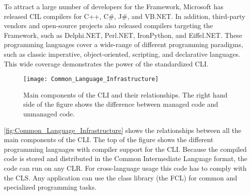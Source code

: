 To attract a large number of developers for the \dotNET Framework, Microsoft has released CIL compilers for C++, C\#, J\#, and VB.NET.
In addition, third-party vendors and open-source projects also released compilers targeting the \dotNET Framework, such as Delphi.NET, Perl.NET, IronPython, and Eiffel.NET.
These programming languages cover a wide-range of different programming paradigms, such as classic imperative, object-oriented, scripting, and declarative languages. This wide coverage demonstrates the power of the standardized CLI.

\begin{figure}
 \centering
 \texttt{[image: Common\_Language\_Infrastructure]}
 \caption[Main components of the CLI and their relationships]{%
    Main components of the CLI and their relationships.
    The right hand side of the figure shows the difference between managed code and unmanaged code.}
 \label{fig:Common_Language_Infrastructure}
\end{figure}

\autoref{fig:Common_Language_Infrastructure} shows the relationships between all the main components of the CLI.
The top of the figure shows the different programming languages with compiler support for the CLI. Because the compiled code is stored and distributed in the Common Intermediate Language format, the code can run on any CLR. For cross-language usage this code has to comply with the CLS.
Any application can use the class library (the FCL) for common and specialized programming tasks. 